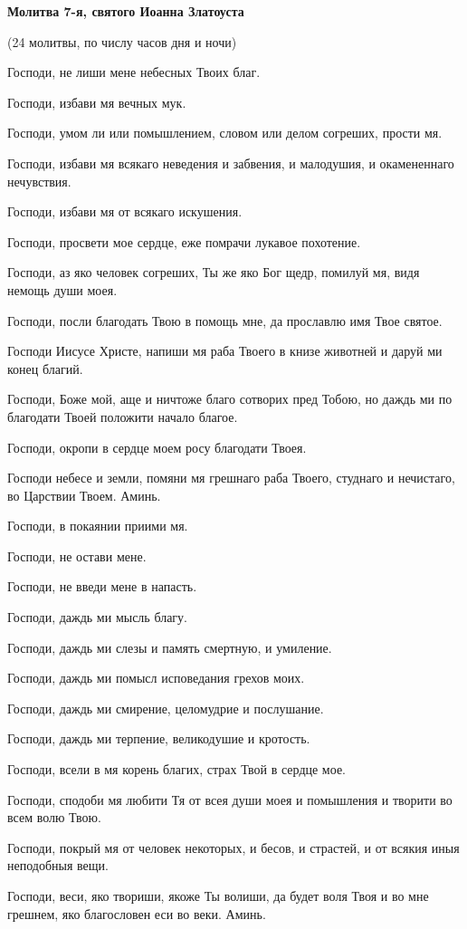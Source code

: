 \medskip
\bfseries Молитва 7-я, святого Иоанна Златоуста 


(24 молитвы, по числу часов дня и ночи)\normalfont{}


Господи, не лиши мене небесных Твоих благ.

Господи, избави мя вечных мук.

Господи, умом ли или помышлением, словом или делом согреших, прости мя.

Господи, избави мя всякаго неведения и забвения, и малодушия, и окамененнаго нечувствия.

Господи, избави мя от всякаго искушения.

Господи, просвети мое сердце, еже помрачи лукавое похотение.

Господи, аз яко человек согреших, Ты же яко Бог щедр, помилуй мя, видя немощь души моея.

Господи, посли благодать Твою в помощь мне, да прославлю имя Твое святое.


Господи Иисусе Христе, напиши мя раба Твоего в книзе животней и даруй ми конец благий.

Господи, Боже мой, аще и ничтоже благо сотворих пред Тобою, но даждь ми по благодати Твоей положити начало благое.


Господи, окропи в сердце моем росу благодати Твоея.


Господи небесе и земли, помяни мя грешнаго раба Твоего, студнаго и нечистаго, во Царствии Твоем. Аминь.

Господи, в покаянии приими мя.


Господи, не остави мене.

Господи, не введи мене в напасть.

Господи, даждь ми мысль благу.

Господи, даждь ми слезы и память смертную, и умиление.


Господи, даждь ми помысл исповедания грехов моих.


Господи, даждь ми смирение, целомудрие и послушание.


Господи, даждь ми терпение, великодушие и кротость.


Господи, всели в мя корень благих, страх Твой в сердце мое.


Господи, сподоби мя любити Тя от всея души моея и помышления и творити во всем волю Твою.

Господи, покрый мя от человек некоторых, и бесов, и страстей, и от всякия иныя неподобныя вещи.

Господи, веси, яко твориши, якоже Ты волиши, да будет воля Твоя и во мне грешнем, яко благословен еси во веки. Аминь.


